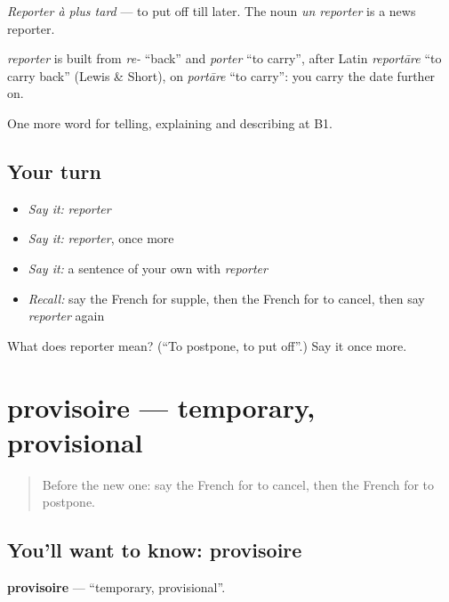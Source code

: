 \emph{Reporter à plus tard} — to put off till later. The noun \emph{un reporter} is a news reporter.

\begin{cousinweb}
\emph{reporter} is built from \emph{re-} \textquotedblleft{}back\textquotedblright{} and \emph{porter} \textquotedblleft{}to carry\textquotedblright{}, after Latin \emph{reportāre} \textquotedblleft{}to carry back\textquotedblright{} (Lewis \& Short), on \emph{portāre} \textquotedblleft{}to carry\textquotedblright{}: you carry the date further on.
\end{cousinweb}

\begin{grammarlens}[title={What you've built}]
One more word for telling, explaining and describing at B1.
\end{grammarlens}

\subsection*{Your turn}
\begin{itemize}
\raggedright
  \item \emph{Say it:} \emph{reporter}
  \item \emph{Say it:} \emph{reporter}, once more
  \item \emph{Say it:} a sentence of your own with \emph{reporter}
  \item \emph{Recall:} say the French for supple, then the French for to cancel, then say \emph{reporter} again
\end{itemize}

\begin{tcolorbox}[breakable,colback=teal!4,colframe=teal!35!black,title={Before you move on}]
What does reporter mean? (\textquotedblleft{}To postpone, to put off\textquotedblright{}.) Say it once more.
\end{tcolorbox}
\section[provisoire]{provisoire — temporary, provisional}

\label{lesson:FR-C371-provisoire}



\begin{quote}
Before the new one: say the French for to cancel, then the French for to postpone.
\end{quote}

\subsection*{You'll want to know: provisoire}
\textbf{provisoire} — \textquotedblleft{}temporary, provisional\textquotedblright{}.

